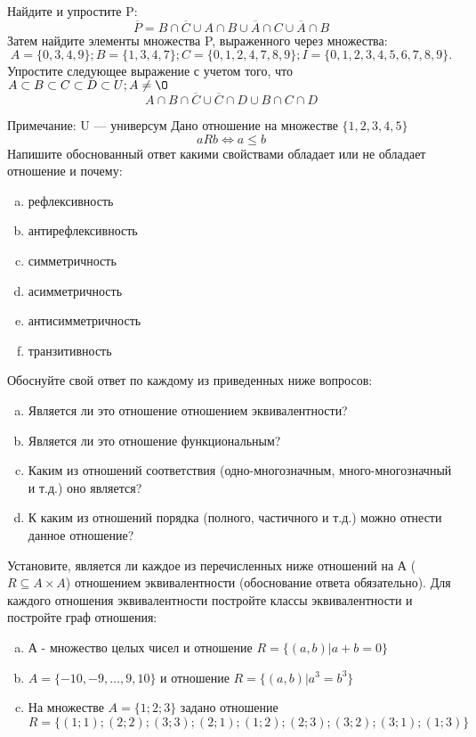 \documentclass[10pt]{exam}
\begin{document}
\begin{questions}
\question
Найдите и упростите P:
\begin{equation*}
\overline{P} = B \cap \overline{C} \cup A \cap B \cup \overline{A} \cap C \cup \overline{A} \cap B
\end{equation*}
Затем найдите элементы множества P, выраженного через множества:
\begin{equation*}
A = \{0, 3, 4, 9\}; 
B = \{1, 3, 4, 7\};
C = \{0, 1, 2, 4, 7, 8, 9\};
I = \{0, 1, 2, 3, 4, 5, 6, 7, 8, 9\}.
\end{equation*}\question
Упростите следующее выражение с учетом того, что $A\subset B \subset C \subset D \subset U; A \neq \O$
\begin{equation*}
A \cap B  \cap \overline{C} \cup \overline{C} \cap D \cup B \cap C \cap D
\end{equation*}

Примечание: U — универсум\question
Дано отношение на множестве $\{1, 2, 3, 4, 5\}$ 
\begin{equation*}
aRb \iff a \leq b
\end{equation*}
Напишите обоснованный ответ какими свойствами обладает или не обладает отношение и почему:   
\begin{enumerate} [a)]\setcounter{enumi}{0}
\item рефлексивность
\item антирефлексивность
\item симметричность
\item асимметричность
\item антисимметричность
\item транзитивность
\end{enumerate}

Обоснуйте свой ответ по каждому из приведенных ниже вопросов:
\begin{enumerate} [a)]\setcounter{enumi}{0}
    \item Является ли это отношение отношением эквивалентности?
    \item Является ли это отношение функциональным?
    \item Каким из отношений соответствия (одно-многозначным, много-многозначный и т.д.) оно является?
    \item К каким из отношений порядка (полного, частичного и т.д.) можно отнести данное отношение?
\end{enumerate}


\question
Установите, является ли каждое из перечисленных ниже отношений на А ($R \subseteq A \times A$) отношением эквивалентности (обоснование ответа обязательно). Для каждого отношения эквивалентности 
постройте классы эквивалентности и постройте граф отношения:
\begin{enumerate}[a)]\setcounter{enumi}{0}
\item А - множество целых чисел и отношение $R = \{(a,b)|a + b = 0\}$
\item $A = \{-10, -9, …, 9, 10\}$ и отношение $R = \{(a,b)|a^{3} = b^{3}\}$
\item На множестве $A = \{1; 2; 3\}$ задано отношение $R = \{(1; 1); (2; 2); (3; 3); (2; 1); (1; 2); (2; 3); (3; 2); (3; 1); (1; 3)\}$


\end{enumerate}
\end{questions}
\end{document}
